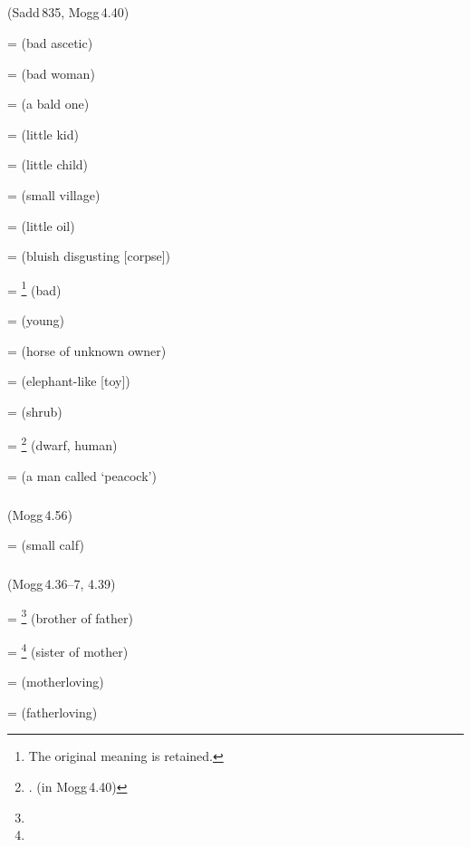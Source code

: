 \subparagraph*{} (Sadd\,835, Mogg\,4.40)\label{pacct14:ka}

 =  (bad ascetic) \par
{} =  (bad woman) \par
{} =  (a bald one) \par
{} =  (little kid) \par
{} =  (little child) \par
{} =  (small village) \par
{} =  (little oil) \par
{} =  (bluish disgusting [corpse]) \par
{} = \footnote{The original meaning is retained.} (bad) \par
{} =  (young) \par
{} =  (horse of unknown owner) \par
{} =  (elephant-like [toy]) \par
{} =  (shrub) \par
{} = \footnote{. (in Mogg\,4.40)} (dwarf, human) \par
{} =  (a man called `peacock') \par

\subparagraph*{} (Mogg\,4.56)\label{pacct14:tara}

 =  (small calf) \par

\subparagraph*{} (Mogg\,4.36--7, 4.39)\label{pacct14:reyyadn}\label{pacct14:cha}

 = \footnote{} (brother of father) \par
{} = \footnote{} (sister of mother) \par
{} =  (motherloving) \par
{} =  (fatherloving) \par

